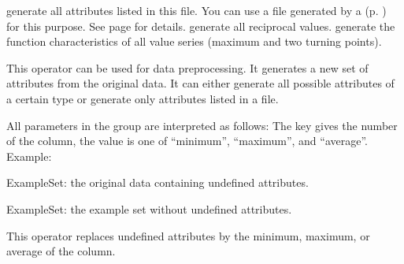 
\featureoperatorio

\begin{parameters}
  \optpar[filename] generate all attributes listed in this file.
  You can use a file generated by a 
  (p. \pageref{sec:op:AttributeSetWriter}) for this purpose. 
  See page \pageref{sec:attributegenerationfiles} for details.
   generate all reciprocal values.
   generate the function
characteristics of all value series (maximum and two turning points).
\end{parameters}

\opdescr This operator can be used for data preprocessing. It
generates a new set of attributes from the original data. It can
either generate all possible attributes of a certain type or generate
only attributes listed in a file.





\begin{parameters}
\reqpar All parameters in the group  are interpreted
as follows: The key gives the number of the column, the value is one
of ``minimum'', ``maximum'', and ``average''.\\[1.5ex]
Example: 
\end{parameters}

\begin{opin}
  \item[ExampleSet:] the original data containing undefined attributes.
\end{opin}

\begin{opout}
  \item [ExampleSet:] the example set without undefined attributes.
\end{opout}

\opdescr This operator replaces undefined attributes by the minimum,
maximum, or average of the column.
